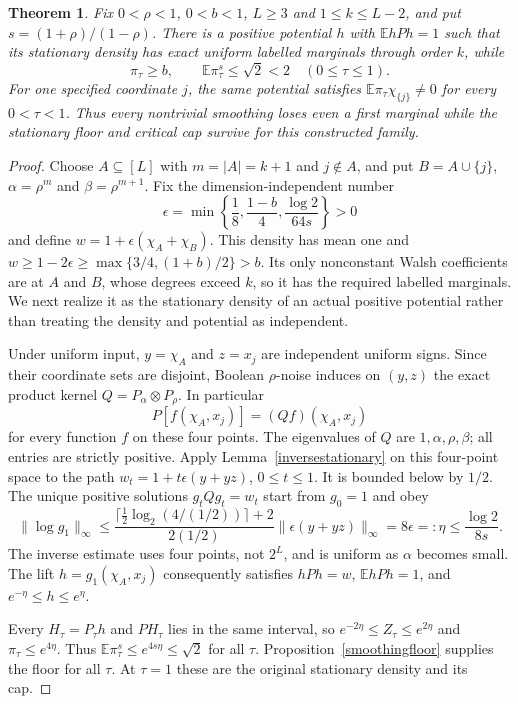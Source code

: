 \documentclass[11pt]{article}
\newcommand{\E}{\mathbb E}
\newtheorem{theorem}{Theorem}[section]
\begin{document}
\begin{theorem}\label{smoothingmatchingfailure}
Fix $0<\rho<1$, $0<b<1$, $L\geq3$ and $1\leq k\leq L-2$, and put
$s=(1+\rho)/(1-\rho)$. There is a positive potential $h$ with
$\E hPh=1$ such that its stationary density has exact uniform labelled
marginals through order $k$, while
\[
 \pi_\tau\geq b,\qquad \E\pi_\tau^s\leq\sqrt2<2
       \quad(0\leq\tau\leq1).
\]
For one specified coordinate $j$, the same potential satisfies
$\E\pi_\tau\chi_{\{j\}}\ne0$ for every $0<\tau<1$.
Thus every nontrivial smoothing loses even a first marginal while the
stationary floor and critical cap survive for this constructed family.
\end{theorem}
\begin{proof}
Choose $A\subseteq[L]$ with $m=|A|=k+1$ and $j\notin A$, and put
$B=A\cup\{j\}$, $\alpha=\rho^m$ and $\beta=\rho^{m+1}$.
Fix the dimension-independent number
\[
 \epsilon=\min\left\{\frac18,\frac{1-b}{4},
                         \frac{\log2}{64s}\right\}>0
\]
and define $w=1+\epsilon(\chi_A+\chi_B)$.
This density has mean one and
$w\geq1-2\epsilon\geq\max\{3/4,(1+b)/2\}>b$.
Its only nonconstant Walsh coefficients are at $A$ and $B$, whose
degrees exceed $k$, so it has the required labelled marginals.
We next realize it as the stationary density of an actual positive
potential rather than treating the density and potential as independent.

Under uniform input, $y=\chi_A$ and $z=x_j$ are independent uniform
signs. Since their coordinate sets are disjoint, Boolean $\rho$-noise
induces on $(y,z)$ the exact product kernel
$Q=P_\alpha\otimes P_\rho$. In particular
\[
 P[f(\chi_A,x_j)]=(Qf)(\chi_A,x_j)
\]
for every function $f$ on these four points. The eigenvalues of $Q$ are
$1,\alpha,\rho,\beta$; all entries are strictly positive.
Apply Lemma~\ref{inversestationary} on this four-point space to the path
$w_t=1+t\epsilon(y+yz)$, $0\leq t\leq1$. It is bounded below by $1/2$.
The unique positive solutions $g_tQg_t=w_t$ start from $g_0=1$ and obey
\[
 \|\log g_1\|_\infty
 \leq\frac{\lceil\tfrac12\log_2(4/(1/2))\rceil+2}{2(1/2)}
                  \|\epsilon(y+yz)\|_\infty
 =8\epsilon=:\eta\leq\frac{\log2}{8s}.
\]
The inverse estimate uses four points, not $2^L$, and is uniform as
$\alpha$ becomes small. The lift $h=g_1(\chi_A,x_j)$ consequently
satisfies $hPh=w$, $\E hPh=1$, and $e^{-\eta}\leq h\leq e^\eta$.

Every $H_\tau=P_\tau h$ and $PH_\tau$ lies in the same interval, so
$e^{-2\eta}\leq Z_\tau\leq e^{2\eta}$ and
$\pi_\tau\leq e^{4\eta}$. Thus
$\E\pi_\tau^s\leq e^{4s\eta}\leq\sqrt2$ for all $\tau$.
Proposition~\ref{smoothingfloor} supplies the floor for all $\tau$.
At $\tau=1$ these are the original stationary density and its cap.


\end{proof}
\end{document}
